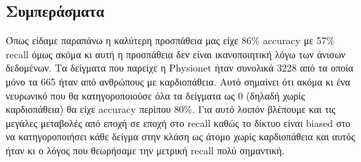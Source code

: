 \documentclass[../main.tex]{subfiles}
\begin{document}
\subsection{Συμπεράσματα}

Όπως είδαμε παραπάνω η καλύτερη προσπάθεια μας είχε 86\% accuracy με 57\% recall
όμως ακόμα κι αυτή η προσπάθεια δεν είναι ικανοποιητική λόγω των άνισων
δεδομένων. Τα δείγματα που παρείχε η Physionet \cite{physionet} ήταν συνολικά
3228 από τα οποία μόνο τα 665 ήταν από ανθρώπους με καρδιοπάθεια. Αυτό σημαίνει
ότι ακόμα κι ένα νευρωνικό που θα κατηγοροποιούσε όλα τα δείγματα ως 0 (δηλαδή
χωρίς καρδιοπάθεια) θα είχε accuracy περίπου 80\%. Για αυτό λοιπόν βλέπουμε και
τις μεγάλες μεταβολές από εποχή σε εποχή στο recall καθώς το δίκτυο είναι biased
στο να κατηγοροποιήσει κάθε δείγμα στην κλάση ως άτομο χωρίς καρδιοπάθεια και
αυτός ήταν κι ο λόγος που θεωρήσαμε την μετρική recall πολύ σημαντική.
\end{document}
